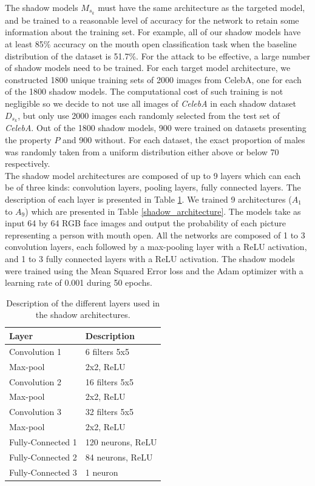 \documentclass[11pt]{article}
\begin{document}
The shadow models $M_{s_k}$ must have the same architecture as the targeted model, and be trained to a reasonable level of accuracy for the network to retain some information about the training set. For example, all of our shadow models have at least 85\% accuracy on the mouth open classification task when the baseline distribution of the dataset is 51.7\%. For the attack to be effective, a large number of shadow models need to be trained. For each target model architecture, we constructed 1800 unique training sets of 2000 images from CelebA, one for each of the 1800 shadow models. The computational cost of such training is not negligible so we decide to not use all images of \textit{CelebA} in each shadow dataset $D_{s_k}$, but only use 2000 images each randomly selected from the test set of \textit{CelebA}. Out of the 1800 shadow models, 900  were trained on datasets presenting the property $P$ and 900 without. For each dataset, the exact proportion of males was randomly taken from a uniform distribution either above or below 70 respectively.\\

The shadow model architectures are composed of up to 9 layers which can each be of three kinds: convolution layers, pooling layers, fully connected layers. The description of each layer is presented in Table \ref{layer_description}. We trained 9 architectures ($A_1$ to $A_9$) which are presented in Table \ref{shadow_architecture}. The models take as input 64 by 64 RGB face images and output the probability of each picture representing a person with mouth open. All the networks are composed of 1 to 3 convolution layers, each followed by a max-pooling layer with a ReLU activation, and 1 to 3 fully connected layers with a ReLU activation. The shadow models were trained using the Mean Squared Error loss and the Adam optimizer with a learning rate of 0.001 during 50 epochs.\\

\begin{table}[h!]
\centering
\begin{tabular}{@{}ll@{}}
\toprule
Layer              & Description       \\ \midrule
Convolution 1     & 6 filters 5x5     \\
Max-pool          & 2x2, ReLU         \\
Convolution 2     & 16 filters 5x5    \\
Max-pool          & 2x2, ReLU         \\
Convolution 3     & 32 filters 5x5    \\
Max-pool          & 2x2, ReLU         \\
Fully-Connected 1 & 120 neurons, ReLU \\
Fully-Connected 2 & 84 neurons, ReLU  \\
Fully-Connected 3 & 1 neuron          \\ \bottomrule
\end{tabular}
\caption{Description of the different layers used in the shadow architectures.}
\label{layer_description}
\end{table}
\end{document}
